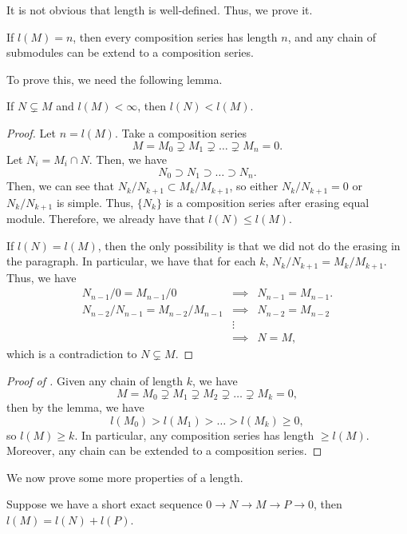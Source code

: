 It is not obvious that length is well-defined.
Thus, we prove it.
\begin{proposition}
    \label{prop:length_is_well_defined}
    If $l(M)=n$, then
    every composition series has length $n$,
    and any chain of submodules can be extend to
    a composition series.
\end{proposition}
To prove this, we need the following lemma.
\begin{lemma}
    If $N\subsetneq M$
    and $l(M)<\infty$, then $l(N) < l(M)$.
\end{lemma}
\begin{proof}
    Let $n=l(M)$.
    Take a composition series
    $$M=M_0\supsetneq M_1\supsetneq \dots\supsetneq M_n =0.$$
    Let $N_i = M_i\cap N$.
    Then, we have
    $$N_0\supset N_1\supset\dots\supset N_n.$$
    Then, we can see that $N_k/N_{k+1} \subset M_k/M_{k+1}$,
    so either $N_k/N_{k+1}=0$ or $N_k/N_{k+1}$ is simple.
    Thus, $\{N_k\}$ is a composition series after
    erasing equal module.
    Therefore, we already have that $l(N)\leq l(M)$.

    If $l(N)=l(M)$, then the only possibility is that
    we did not do the erasing in the paragraph.
    In particular, we have that for each $k$,
    $N_k/N_{k+1} = M_k/M_{k+1}$.
    Thus, we have
    $$\begin{array}{rcl}
	N_{n-1}/0  = M_{n-1}/0 &\implies & N_{n-1}=M_{n-1}. \\[4pt]
	N_{n-2}/N_{n-1} = M_{n-2}/M_{n-1}
		&\implies & N_{n-2}=M_{n-2} \\[4pt]
		& \vdots & \\[4pt]
	      &\implies & N=M,
    \end{array}$$
    which is a contradiction to $N\subsetneq M$.
\end{proof}
\begin{proof}[Proof of ]
    Given any chain of length $k$, we have
    $$M = M_0\supsetneq M_1\supsetneq M_2\supsetneq
    \dots\supsetneq M_k = 0,$$
    then by the lemma, we have
    $$l(M_0) > l(M_1) > \dots > l(M_k)\geq 0,$$
    so $l(M)\geq k$.
    In particular, any composition series has length $\geq l(M)$.
    Moreover, any chain can be extended to a composition series.
\end{proof}
We now prove some more properties of a length.
\begin{proposition}
    \label{prop:length_exact}
    Suppose we have a short exact sequence
    $0\to N\to M\to P\to 0$,
    then $l(M) = l(N)+l(P)$.
\end{proposition}
